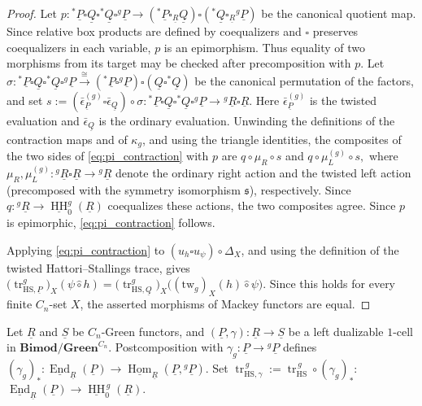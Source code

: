\documentclass[11pt,oneside]{amsart}
\DeclareMathOperator{\Hom}{Hom}
\DeclareMathOperator{\HH}{HH}
\DeclareMathOperator{\End}{End}
\numberwithin{equation}{section}
\numberwithin{figure}{section}
\theoremstyle{plain}
\theoremstyle{definition}
\theoremstyle{remark}
\begin{document}
\begin{proof}
Let
\(
p\colon
{}^*\underline P\square\underline Q
\square{}^*\underline Q\square{}^g\underline P
\to
({}^*\underline P\square_{\underline R}\underline Q)
\square
({}^*\underline Q\square_{\underline R}{}^g\underline P)
\)
be the canonical quotient map. Since relative box products are
defined by coequalizers and \(\square\) preserves coequalizers in
each variable, \(p\) is an epimorphism. Thus equality of two
morphisms from its target may be checked after precomposition
with \(p\).
Let
\(
\sigma\colon
{}^*\underline P\square\underline Q
\square{}^*\underline Q\square{}^g\underline P
\xrightarrow{\cong}
({}^*\underline P\square{}^g\underline P)
\square
(\underline Q\square{}^*\underline Q)
\)
be the canonical permutation of the factors, and set
\(s
:=
(\bar\epsilon_{\underline P}^{(g)}
 \square\bar\epsilon_{\underline Q})
\circ\sigma
\colon
{}^*\underline P\square\underline Q
\square{}^*\underline Q\square{}^g\underline P
\to
{}^g\underline R\square\underline R.
\)
Here \(\bar\epsilon_{\underline P}^{(g)}\) is the twisted evaluation
and \(\bar\epsilon_{\underline Q}\) is the ordinary evaluation.
Unwinding the definitions of the contraction maps and of
\(\kappa_g\), and using the triangle identities, the composites of
the two sides of \eqref{eq:pi_contraction} with \(p\) are
\(
q\circ\mu_R\circ s
\) and
\(q\circ\mu_L^{(g)}\circ s,
\)
where \(\mu_R, \mu_L^{(g)}\colon {}^g\underline{R}\square\underline{R}\to{}^g\underline{R}\) denote the ordinary right action and the twisted left action (precomposed with the symmetry isomorphism \(\mathfrak{s}\)), respectively.
 Since
\(q\colon{}^g\underline R\to\underline{\HH}_0^g(\underline R)\)
coequalizes these actions, the two composites agree. Since \(p\) is
epimorphic, \eqref{eq:pi_contraction} follows.


Applying \eqref{eq:pi_contraction} to
\((u_h\square u_\psi)\circ\Delta_X\), and using the definition of the
twisted Hattori--Stallings trace, gives
\(
\bigl(\operatorname{tr}_{\mathrm{HS},\underline P}^g\bigr)_X
(\psi\mathbin{\hat\circ}h)
=
\bigl(\operatorname{tr}_{\mathrm{HS},\underline Q}^g\bigr)_X
\bigl((\mathrm{tw}_g)_X(h)\mathbin{\hat\circ}\psi\bigr).
\)
Since this holds for every finite \(C_n\)-set \(X\), the asserted
morphisms of Mackey functors are equal.
\end{proof}


 

 

Let \(\underline R\) and \(\underline S\) be \(C_n\)-Green functors,
and 
\(
(\underline P,\gamma)\colon\underline R\to\underline S
\)
be a left dualizable \(1\)-cell in
\(\mathbf{Bimod}/\mathbf{Green}^{C_n}\).
Postcomposition with
\(\gamma_g\colon\underline P\to{}^g\underline P\) defines
\(
(\gamma_g)_*\colon
\underline{\End}_{\underline R}(\underline P)
\to
\underline{\Hom}_{\underline R}
(\underline P,{}^g\underline P).
\)
Set
\(
\operatorname{tr}_{\mathrm{HS},\gamma}^{\,g}
:=
\operatorname{tr}_{\mathrm{HS}}^{\,g}\circ(\gamma_g)_*
\colon\)
\(\underline{\End}_{\underline R}(\underline P)
\to
\underline{\HH}_0^{\,g}(\underline R).
\)
\end{document}
